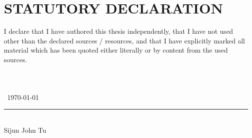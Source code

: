 \thispagestyle{empty}
\section*{STATUTORY DECLARATION}
I declare that I have authored this thesis independently, that I have not used other than the declared
sources / resources, and that I have explicitly marked all material which has been quoted either
literally or by content from the used sources.\\\\\\\\\
\today \\[5cm]
\rule{10cm}{0.4pt}\\
Sijun John Tu